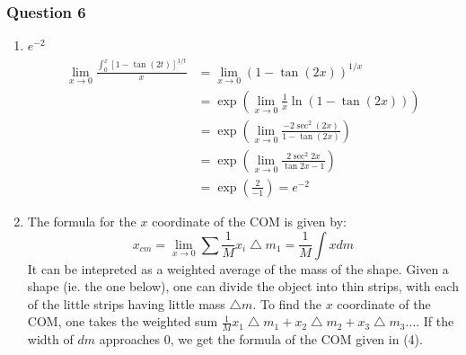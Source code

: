 \documentclass{article}
\begin{document}
\pagebreak
\subsubsection*{Question 6}

\begin{enumerate}[label=\alph*)]
    \item $e^{-2}$
    \begin{align*}
        \lim_{x \rightarrow 0} \frac{\int^x_0 \left[1-\tan(2t)\right]^{1/t}}{x} &= \lim_{x \rightarrow 0} \left(1-\tan(2x)\right)^{1/x} \\
        &=\exp\left(\lim_{x \rightarrow 0} \frac{1}{x} \ln(1-\tan(2x))\right) \\
        &= \exp\left(\lim_{x \rightarrow 0} \frac{-2\sec^2(2x)}{1-\tan(2x)}\right) \\
        &= \exp\left(\lim_{x \rightarrow 0} \frac{2\sec^2 2x}{\tan2x -1}\right)\\
        &= \exp\left({\frac{2}{-1}}\right) = e^{-2}
    \end{align*}
    
    \item The formula for the $x$ coordinate of the COM is given by:
    \begin{equation}
        x_{cm}=\lim_{x \rightarrow 0} \sum \frac{1}{M}x_i \bigtriangleup m_1 = \frac{1}{M}\int x dm
    \end{equation}
    It can be intepreted as a weighted average of the mass of the shape. Given a shape (ie. the one below), one can divide the object into thin strips, with each of the little strips having little mass $\bigtriangleup m$. To find the $x$ coordinate of the COM, one takes the weighted sum $\frac{1}{M} x_1 \bigtriangleup m_1 + x_2 \bigtriangleup m_2 + x_3 \bigtriangleup m_3 \ldots$. If the width of $dm$ approaches $0$, we get the formula of the COM given in (4).
    

\end{enumerate}
\end{document}
